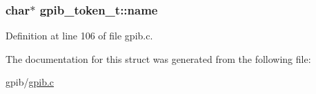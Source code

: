 \subsubsection[{\texorpdfstring{name}{name}}]{\setlength{\rightskip}{0pt plus 5cm}char$\ast$ gpib\+\_\+token\+\_\+t\+::name}\hypertarget{structgpib__token__t_aa47fb36b52bd83dc60e67a54f6e36e09}{}\label{structgpib__token__t_aa47fb36b52bd83dc60e67a54f6e36e09}


Definition at line 106 of file gpib.\+c.



The documentation for this struct was generated from the following file\+:\begin{DoxyCompactItemize}
\item 
gpib/\hyperlink{gpib_8c}{gpib.\+c}\end{DoxyCompactItemize}
